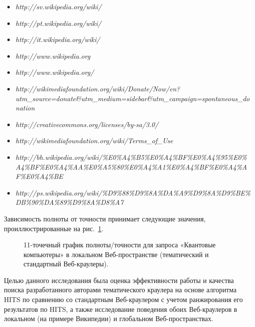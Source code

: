 \begin{itemize}
	\item \textit{http://sv.wikipedia.org/wiki/} 
	\item \textit{http://pt.wikipedia.org/wiki/}
	\item \textit{http://it.wikipedia.org/wiki/}
	\item \textit{http://www.wikipedia.org}
	\item \textit{http://www.wikipedia.org/}
	\item \textit{http://wikimediafoundation.org/wiki/Donate/Now/en?utm\_source=\linebreak donate\&utm\_medium=sidebar\&utm\_campaign=spontaneous\_donation}
	\item \textit{http://creativecommons.org/licenses/by-sa/3.0/}
	\item \textit{http://wikimediafoundation.org/wiki/Terms\_of\_Use} 
	\item \textit{http://bh.wikipedia.org/wiki/\%E0\%A4\%B5\%E0\%A4\%BF\%E0\%A4\%95\%E0\%A4\linebreak\%BF\%E0\%A4\%AA\%E0\%A5\%80\%E0\%A4\%A1\%E0\%A4\%BF\%E0\%A4\%AF\%E0\%A4\%BE}
	\item \textit{http://ps.wikipedia.org/wiki/\%D9\%88\%D9\%8A\%DA\linebreak\%A9\%D9\%8A\%D9\%BE\%DB\%90\%DA\%89\%D9\%8A\%D8\%A7}
\end{itemize}

Зависимость полноты от точности принимает следующие значения, проиллюстрированные на рис.~\cref{fig:quantumComputerLocalPR}.

\begin{figure}[ht]
	\caption{11-точечный график полноты/точности для запроса «Квантовые компьютеры» в локальном Веб-пространстве (тематический и стандартный Веб-краулеры).}\label{fig:quantumComputerLocalPR}
\end{figure}

Целью данного исследования была оценка эффективности работы и качества поиска разработанного авторами тематического краулера на основе алгоритма HITS по сравнению со стандартным Веб-краулером с учетом ранжирования его результатов по HITS, а также исследование поведения обоих Веб-краулеров в локальном (на примере Википедии) и глобальном Веб-пространствах.

